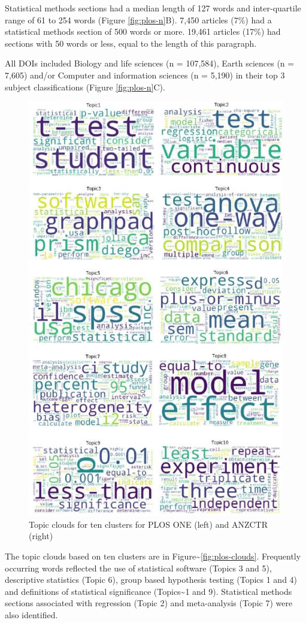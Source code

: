 \documentclass[12pt]{article}
\begin{document}
Statistical methods sections had a median length of 127 words and
inter-quartile range of 61 to 254 words (Figure \ref{fig:plos-n}B).
7,450 articles (7\%) had a statistical methods section of 500 words or
more. 19,461 articles (17\%) had sections with 50 words or less, equal
to the length of this paragraph.

All DOIs included Biology and life sciences (n = 107,584), Earth
sciences (n = 7,605) and/or Computer and information sciences (n =
5,190) in their top 3 subject classifications (Figure
\ref{fig:plos-n}C).

\begin{figure}

{\centering \includegraphics[width=0.7\linewidth]{figures/plos.wordclouds} 

}

\caption{\label{fig:plos-clouds}Topic clouds for ten clusters for PLOS ONE (left) and ANZCTR (right)}\label{fig:unnamed-chunk-5}
\end{figure}

The topic clouds based on ten clusters are in
Figure\textasciitilde{}\ref{fig:plos-clouds}. Frequently occurring words
reflected the use of statistical software (Topics 3 and 5), descriptive
statistics (Topic 6), group based hypothesis testing (Topics 1 and 4)
and definitions of statistical significance (Topics\textasciitilde1 and
9). Statistical methods sections associated with regression (Topic 2)
and meta-analysis (Topic 7) were also identified.
\end{document}
